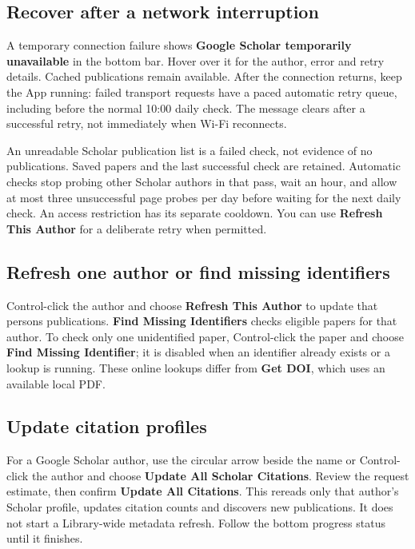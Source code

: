 \documentclass[10pt,letterpaper,oneside]{scrreprt}
\begin{document}
\subsection{Recover after a network interruption}\label{recover-after-a-network-interruption}

A temporary connection failure shows \textbf{Google Scholar temporarily unavailable} in the bottom bar. Hover over it for the author, error and retry details. Cached publications remain available. After the connection returns, keep the App running: failed transport requests have a paced automatic retry queue, including before the normal 10:00 daily check. The message clears after a successful retry, not immediately when Wi-Fi reconnects.

An unreadable Scholar publication list is a failed check, not evidence of no publications. Saved papers and the last successful check are retained. Automatic checks stop probing other Scholar authors in that pass, wait an hour, and allow at most three unsuccessful page probes per day before waiting for the next daily check. An access restriction has its separate cooldown. You can use \textbf{Refresh This Author} for a deliberate retry when permitted.

\subsection{Refresh one author or find missing identifiers}\label{refresh-one-author-or-find-missing-identifiers}

Control-click the author and choose \textbf{Refresh This Author} to update that person\textquotesingle s publications. \textbf{Find Missing Identifiers} checks eligible papers for that author. To check only one unidentified paper, Control-click the paper and choose \textbf{Find Missing Identifier}; it is disabled when an identifier already exists or a lookup is running. These online lookups differ from \textbf{Get DOI}, which uses an available local PDF.

\subsection{Update citation profiles}\label{update-citation-profiles}

For a Google Scholar author, use the circular arrow beside the name or Control-click the author and choose \textbf{Update All Scholar Citations}. Review the request estimate, then confirm \textbf{Update All Citations}. This rereads only that author's Scholar profile, updates citation counts and discovers new publications. It does not start a Library-wide metadata refresh. Follow the bottom progress status until it finishes.
\end{document}
